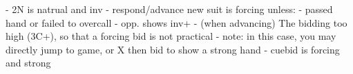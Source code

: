 - 2N is natrual and inv
- respond/advance new suit is forcing unless:
    - passed hand or failed to overcall
    - opp. shows inv+
    - (when advancing) The bidding too high (3C+), so that a forcing bid is not practical
        - note: in this case, you may directly jump to game, or X then bid to show a strong hand
- cuebid is forcing and strong
